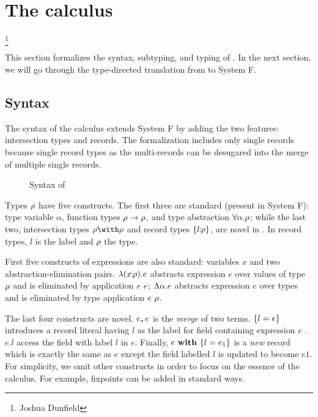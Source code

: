 \section{The \name calculus}

\footnote{Joshua Dunfield}

This section formalizes the syntax, subtyping, and typing of \name. In the next
section, we will go through the type-directed translation from \name to System
F.


\subsection{Syntax}

The syntax of the \name calculus extends System F by adding the two features:
intersection types and records. The formalization includes only single records
because single record types as the multi-records can be desugared into the merge
of multiple single records.

\begin{figure}

\caption{Syntax of \name}
\end{figure}

Types $ \rho $ have five constructs. The first three are standard (present in
System F): type variable $ \alpha $, function types $ \rho \to \rho $, and type
abstraction $ \forall \alpha. \rho $; while the last two, intersection types
$ \ty \with \ty $ and record types $ \{ {l} \!\!:\!\! {\rho} \} $, are novel in \Name. In
record types, $ l $ is the label and $ \rho $ the type.

First five constructs of expressions are also standard: variables $ x $ and two
abstraction-elimination pairs. $ \lambda ({x} \!\!:\!\! {\rho}). {e} $ abstracts expression
$ e $ over values of type $ \rho $ and is eliminated by application $ {e} ~ {e} $;
$ \Lambda {\alpha}. {e} $ abstracts expression $ e $ over types and is eliminated by
type application $ {e} ~ {\rho} $.

The last four constructs are novel. $ e ,\!\!, e $ is the \emph{merge} of two
terms. $ \{ l = e \} $ introduces a record literal having $ l $ as the
label for field containing expression $ e $ . $ e.l $ access the field with
label $ l $ in $ e $. Finally, $ e ~ \textbf{with} ~ \{ l = e_1 \} $ is a \emph{new}
record which is exactly the same as $ e $ except the field labelled $ l $ is
updated to become $ e1 $. For simplicity, we omit other constructs in order to
focus on the essence of the calculus. For example, fixpoints can be added in
standard ways.

